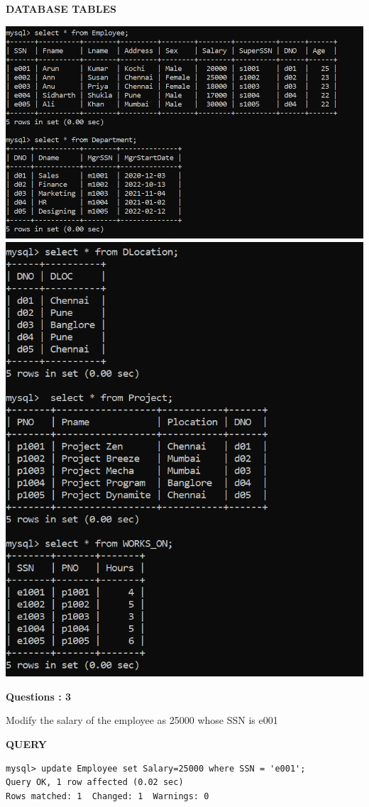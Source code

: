 \documentclass[a4paper,12pt]{report}
\begin{document}
\begin{flushleft}
		\textbf{DATABASE TABLES}
\end{flushleft} 
\includegraphics[scale=1]{select1.png}
\includegraphics[scale=1]{select2.png}


\begin{flushleft}
    \textbf{Questions : 3}
\end{flushleft}
Modify the salary of the employee as 25000 whose SSN is e001
\begin{flushleft}
		\textbf{QUERY }
	\end{flushleft}
\begin{verbatim}
mysql> update Employee set Salary=25000 where SSN = 'e001';
Query OK, 1 row affected (0.02 sec)
Rows matched: 1  Changed: 1  Warnings: 0
\end{verbatim}
\end{document}
